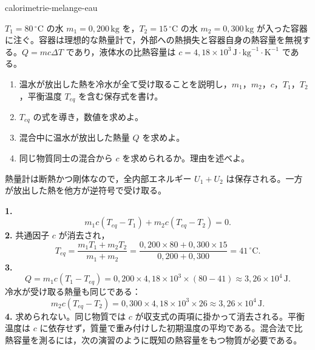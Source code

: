 \begin{exo}[二つの水塊の混合]{calorimetrie-melange-eau}

$T_1=80\,^\circ\text{C}$ の水 $m_1=0{,}200\,\text{kg}$ を，$T_2=15\,^\circ\text{C}$ の水 $m_2=0{,}300\,\text{kg}$ が入った容器に注ぐ。容器は理想的な熱量計で，外部への熱損失と容器自身の熱容量を無視する。$Q=mc\Delta T$ であり，液体水の比熱容量は $c=4{,}18\times10^3\,\text{J}\!\cdot\!\text{kg}^{-1}\!\cdot\!\text{K}^{-1}$ である。
\begin{enumerate}
  \item 温水が放出した熱を冷水が全て受け取ることを説明し，$m_1$，$m_2$，$c$，$T_1$，$T_2$，平衡温度 $T_{eq}$ を含む保存式を書け。
  \item $T_{eq}$ の式を導き，数値を求めよ。
  \item 混合中に温水が放出した熱量 $Q$ を求めよ。
  \item 同じ物質同士の混合から $c$ を求められるか。理由を述べよ。
\end{enumerate}
\begin{indication}
熱量計は断熱かつ剛体なので，全内部エネルギー $U_1+U_2$ は保存される。一方が放出した熱を他方が逆符号で受け取る。
\end{indication}
\begin{solution}
\textbf{1.}
\[
m_1c(T_{eq}-T_1)+m_2c(T_{eq}-T_2)=0.
\]
\textbf{2.} 共通因子 $c$ が消去され，
\[
T_{eq}=\frac{m_1T_1+m_2T_2}{m_1+m_2}
=\frac{0{,}200\times80+0{,}300\times15}{0{,}200+0{,}300}=41\,^\circ\text{C}.
\]
\textbf{3.}
\[
Q=m_1c(T_1-T_{eq})=0{,}200\times4{,}18\times10^3\times(80-41)
\approx3{,}26\times10^4\,\text{J}.
\]
冷水が受け取る熱量も同じである：
\[
m_2c(T_{eq}-T_2)=0{,}300\times4{,}18\times10^3\times26
\approx3{,}26\times10^4\,\text{J}.
\]
\textbf{4.} 求められない。同じ物質では $c$ が収支式の両項に掛かって消去される。平衡温度は $c$ に依存せず，質量で重み付けした初期温度の平均である。混合法で比熱容量を測るには，次の演習のように既知の熱容量をもつ物質が必要である。
\end{solution}
\end{exo}

